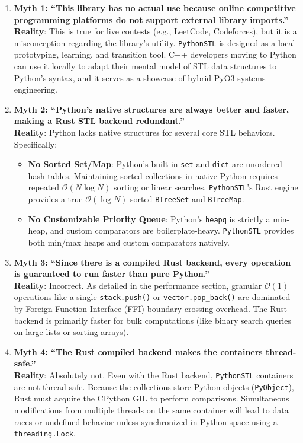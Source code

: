\documentclass[11pt,a4paper]{article}
\begin{document}
\begin{enumerate}
    \item \textbf{Myth 1: ``This library has no actual use because online competitive programming platforms do not support external library imports.''}
    \\ \textbf{Reality}: This is true for live contests (e.g., LeetCode, Codeforces), but it is a misconception regarding the library's utility. \texttt{PythonSTL} is designed as a local prototyping, learning, and transition tool. C++ developers moving to Python can use it locally to adapt their mental model of STL data structures to Python's syntax, and it serves as a showcase of hybrid PyO3 systems engineering.

    \item \textbf{Myth 2: ``Python's native structures are always better and faster, making a Rust STL backend redundant.''}
    \\ \textbf{Reality}: Python lacks native structures for several core STL behaviors. Specifically:
    \begin{itemize}
        \item \textbf{No Sorted Set/Map}: Python's built-in \texttt{set} and \texttt{dict} are unordered hash tables. Maintaining sorted collections in native Python requires repeated $\mathcal{O}(N \log N)$ sorting or linear searches. \texttt{PythonSTL}'s Rust engine provides a true $\mathcal{O}(\log N)$ sorted \texttt{BTreeSet} and \texttt{BTreeMap}.
        \item \textbf{No Customizable Priority Queue}: Python's \texttt{heapq} is strictly a min-heap, and custom comparators are boilerplate-heavy. \texttt{PythonSTL} provides both min/max heaps and custom comparators natively.
    \end{itemize}

    \item \textbf{Myth 3: ``Since there is a compiled Rust backend, every operation is guaranteed to run faster than pure Python.''}
    \\ \textbf{Reality}: Incorrect. As detailed in the performance section, granular $\mathcal{O}(1)$ operations like a single \texttt{stack.push()} or \texttt{vector.pop\_back()} are dominated by Foreign Function Interface (FFI) boundary crossing overhead. The Rust backend is primarily faster for bulk computations (like binary search queries on large lists or sorting arrays).

    \item \textbf{Myth 4: ``The Rust compiled backend makes the containers thread-safe.''}
    \\ \textbf{Reality}: Absolutely not. Even with the Rust backend, \texttt{PythonSTL} containers are not thread-safe. Because the collections store Python objects (\texttt{PyObject}), Rust must acquire the CPython GIL to perform comparisons. Simultaneous modifications from multiple threads on the same container will lead to data races or undefined behavior unless synchronized in Python space using a \texttt{threading.Lock}.


\end{enumerate}
\end{document}
